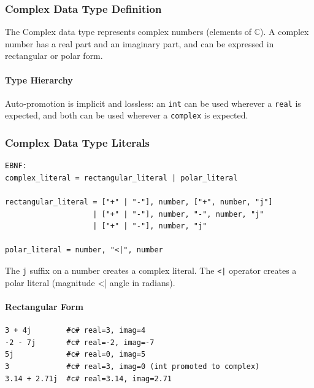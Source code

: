 \subsubsection{Complex Data Type Definition}
The Complex data type represents complex numbers (elements of $\mathbb{C}$). A complex number has a real part and an imaginary part, and can be expressed in rectangular or polar form.

\paragraph{Type Hierarchy}
\begin{center}
\end{center}

Auto-promotion is implicit and lossless: an \texttt{int} can be used wherever a \texttt{real} is expected, and both can be used wherever a \texttt{complex} is expected.

\subsubsection{Complex Data Type Literals}
\begin{verbatim}
EBNF:
complex_literal = rectangular_literal | polar_literal

rectangular_literal = ["+" | "-"], number, ["+", number, "j"] 
                    | ["+" | "-"], number, "-", number, "j"
                    | ["+" | "-"], number, "j"

polar_literal = number, "<|", number
\end{verbatim}

The \texttt{j} suffix on a number creates a complex literal. The \texttt{<|} operator creates a polar literal (magnitude <| angle in radians).

\paragraph{Rectangular Form}
\begin{verbatim}
3 + 4j        #c# real=3, imag=4
-2 - 7j       #c# real=-2, imag=-7
5j            #c# real=0, imag=5
3             #c# real=3, imag=0 (int promoted to complex)
3.14 + 2.71j  #c# real=3.14, imag=2.71
\end{verbatim}

